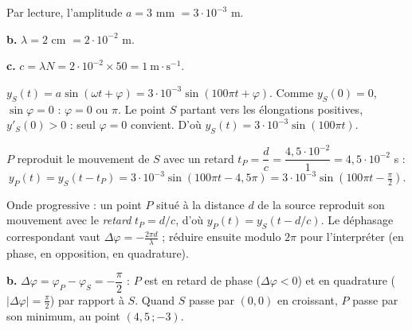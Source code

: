 \documentclass[11pt]{article}
\begin{document}
\begin{center}
\end{center}

 Par lecture, l'amplitude $a = 3$ mm $= 3\cdot10^{-3}$ m.

\textbf{b.} $\lambda = 2$ cm $= 2\cdot10^{-2}$ m.

\textbf{c.} $c = \lambda N = 2\cdot10^{-2}\times 50 = 1\ \text{m}\cdot\text{s}^{-1}$.

 $y_S(t) = a\sin(\omega t + \varphi) = 3\cdot10^{-3}\sin(100\pi t + \varphi)$. Comme $y_S(0) = 0$, $\sin\varphi = 0$ : $\varphi = 0$ ou $\pi$. Le point $S$ partant vers les élongations positives, $y'_S(0) > 0$ : seul $\varphi = 0$ convient. D'où $y_S(t) = 3\cdot10^{-3}\sin(100\pi t)$.

 $P$ reproduit le mouvement de $S$ avec un retard $t_P = \dfrac{d}{c} = \dfrac{4{,}5\cdot10^{-2}}{1} = 4{,}5\cdot10^{-2}$ s :
\[ y_P(t) = y_S(t - t_P) = 3\cdot10^{-3}\sin(100\pi t - 4{,}5\pi) = 3\cdot10^{-3}\sin\left(100\pi t - \tfrac{\pi}{2}\right). \]

\begin{methode}
Onde progressive : un point $P$ situé à la distance $d$ de la source
reproduit son mouvement avec le \emph{retard} $t_P = d/c$, d'où
$y_P(t) = y_S(t - d/c)$. Le déphasage correspondant vaut
$\Delta\varphi = -\frac{2\pi d}{\lambda}$ ; réduire ensuite modulo
$2\pi$ pour l'interpréter (en phase, en opposition, en quadrature).
\end{methode}

\textbf{b.} $\Delta\varphi = \varphi_P - \varphi_S = -\dfrac{\pi}{2}$ : $P$ est en retard de phase ($\Delta\varphi < 0$) et en quadrature ($|\Delta\varphi| = \frac{\pi}{2}$) par rapport à $S$. Quand $S$ passe par $(0,0)$ en croissant, $P$ passe par son minimum, au point $(4{,}5\,;-3)$.
\end{document}
